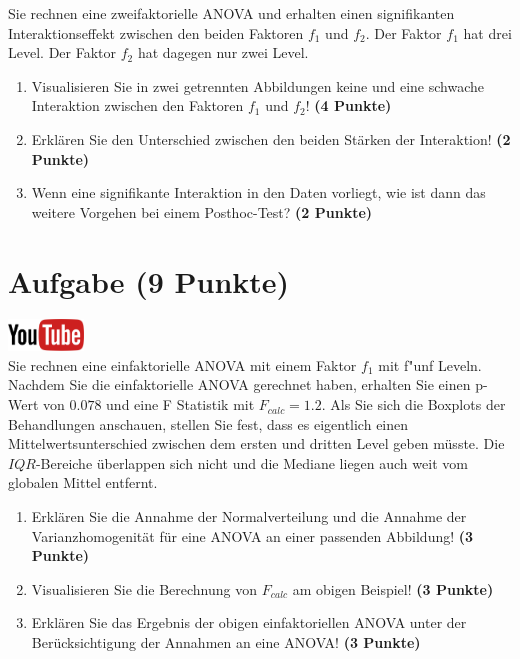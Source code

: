 \documentclass[a4paper, 9pt]{scrartcl}\usepackage[]{graphicx}\usepackage[]{xcolor}
\begin{document}
Sie rechnen eine zweifaktorielle ANOVA und erhalten einen signifikanten
Interaktionseffekt zwischen den beiden Faktoren $f_1$ und $f_2$. Der Faktor
$f_1$ hat drei Level. Der Faktor $f_2$ hat dagegen nur zwei Level.




\begin{enumerate}
\item Visualisieren Sie in zwei getrennten Abbildungen 
  keine und eine schwache Interaktion zwischen
  den Faktoren $f_1$ und $f_2$! \textbf{(4 Punkte)}
\item Erkl{\"a}ren Sie den Unterschied zwischen den beiden St{\"a}rken der Interaktion!
  \textbf{(2 Punkte)}
\item Wenn eine signifikante Interaktion in den Daten vorliegt, wie ist
  dann das weitere Vorgehen bei einem Posthoc-Test? 
  \textbf{(2 Punkte)}
\end{enumerate}

 
\clearpage

\section{Aufgabe \hfill (9 Punkte)}

\hfill\href{https://youtu.be/M9Uhm67ndxM}{\includegraphics[width =
  2cm]{img/youtube}}\\[1Ex]




Sie rechnen eine einfaktorielle ANOVA mit einem Faktor $f_1$ mit
f{"u}nf Leveln. Nachdem Sie die einfaktorielle ANOVA gerechnet
haben, erhalten Sie einen p-Wert von $0.078$ und eine F Statistik mit
$F_{calc} = 1.2$. Als Sie sich die Boxplots der Behandlungen anschauen,
stellen Sie fest, dass es eigentlich einen Mittelwertsunterschied zwischen
dem ersten und dritten Level geben m{\"u}sste. Die
$IQR$-Bereiche {\"u}berlappen sich nicht und die Mediane liegen auch weit vom
globalen Mittel entfernt.


\begin{enumerate}
\item Erkl{\"a}ren Sie die Annahme der Normalverteilung und die Annahme der
  Varianzhomogenit{\"a}t f{\"u}r eine ANOVA an einer passenden Abbildung! \textbf{(3 Punkte)}
\item Visualisieren Sie die Berechnung von $F_{calc}$ am obigen Beispiel!
  \textbf{(3 Punkte)}
\item Erkl{\"a}ren Sie das Ergebnis der obigen einfaktoriellen ANOVA unter der
  Ber{\"u}cksichtigung der Annahmen an eine ANOVA! \textbf{(3 Punkte)}
\end{enumerate}
\end{document}
